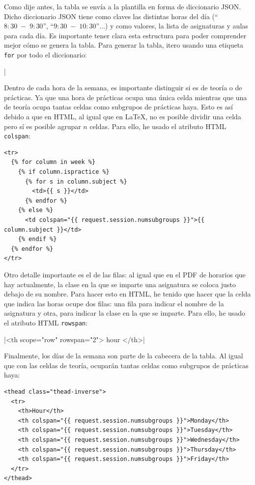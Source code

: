 Como dije antes, la tabla se envía a la plantilla en forma de diccionario JSON. Dicho diccionario JSON tiene como claves las distintas horas del día (``$8:30\;-\;9:30$'', ``$9:30\;-\;10:30$''$\ldots$) y como valores, la lista de asignaturas y aulas para cada día. Es importante tener clara esta estructura para poder comprender mejor cómo se genera la tabla. Para generar la tabla, itero usando una etiqueta \texttt{for} por todo el diccionario:

|{%

Dentro de cada hora de la semana, es importante distinguir si es de teoría o de prácticas. Ya que una hora de prácticas ocupa una única celda mientras que una de teoría ocupa tantas celdas como subgrupos de prácticas haya. Esto es así debido a que en HTML, al igual que en \LaTeX, no es posible dividir una celda pero sí es posible agrupar $n$ celdas. Para ello, he usado el atributo HTML \texttt{colspan}:

\begin{verbatim}
<tr>
  {% for column in week %}
    {% if column.ispractice %}
      {% for s in column.subject %}
        <td>{{ s }}</td>
      {% endfor %}
    {% else %}
      <td colspan="{{ request.session.numsubgroups }}">{{ column.subject }}</td>
    {% endif %}
  {% endfor %}
</tr>
\end{verbatim}

Otro detalle importante es el de las filas: al igual que en el PDF de horarios que hay actualmente, la clase en la que se imparte una asignatura se coloca justo debajo de su nombre. Para hacer esto en HTML, he tenido que hacer que la celda que indica las horas ocupe dos filas: una fila para indicar el nombre de la asignatura y otra, para indicar la clase en la que se imparte. Para ello, he usado el atributo HTML \texttt{rowspan}:

|<th scope="row" rowspan="2"> {{ hour }}</th>|

Finalmente, los días de la semana son parte de la cabecera de la tabla. Al igual que con las celdas de teoría, ocuparán tantas celdas como subgrupos de prácticas haya:

\begin{verbatim}
<thead class="thead-inverse">
  <tr>
    <th>Hour</th>
    <th colspan="{{ request.session.numsubgroups }}">Monday</th>
    <th colspan="{{ request.session.numsubgroups }}">Tuesday</th>
    <th colspan="{{ request.session.numsubgroups }}">Wednesday</th>
    <th colspan="{{ request.session.numsubgroups }}">Thursday</th>
    <th colspan="{{ request.session.numsubgroups }}">Friday</th>
  </tr>
</thead>
\end{verbatim}

}
